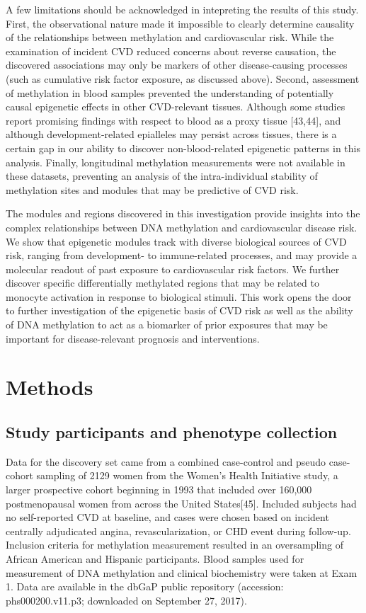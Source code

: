 \documentclass[]{article}
\theoremstyle{definition}
\theoremstyle{definition}
\theoremstyle{definition}
\theoremstyle{remark}
\begin{document}
A few limitations should be acknowledged in intepreting the results of
this study. First, the observational nature made it impossible to
clearly determine causality of the relationships between methylation and
cardiovascular risk. While the examination of incident CVD reduced
concerns about reverse causation, the discovered associations may only
be markers of other disease-causing processes (such as cumulative risk
factor exposure, as discussed above). Second, assessment of methylation
in blood samples prevented the understanding of potentially causal
epigenetic effects in other CVD-relevant tissues. Although some studies
report promising findings with respect to blood as a proxy tissue
{[}43,44{]}, and although development-related epialleles may persist
across tissues, there is a certain gap in our ability to discover
non-blood-related epigenetic patterns in this analysis. Finally,
longitudinal methylation measurements were not available in these
datasets, preventing an analysis of the intra-individual stability of
methylation sites and modules that may be predictive of CVD risk.

The modules and regions discovered in this investigation provide
insights into the complex relationships between DNA methylation and
cardiovascular disease risk. We show that epigenetic modules track with
diverse biological sources of CVD risk, ranging from development- to
immune-related processes, and may provide a molecular readout of past
exposure to cardiovascular risk factors. We further discover specific
differentially methylated regions that may be related to monocyte
activation in response to biological stimuli. This work opens the door
to further investigation of the epigenetic basis of CVD risk as well as
the ability of DNA methylation to act as a biomarker of prior exposures
that may be important for disease-relevant prognosis and interventions.

\newpage

\section{Methods}\label{methods}

\subsection{Study participants and phenotype
collection}\label{study-participants-and-phenotype-collection}

Data for the discovery set came from a combined case-control and pseudo
case-cohort sampling of 2129 women from the Women's Health Initiative
study, a larger prospective cohort beginning in 1993 that included over
160,000 postmenopausal women from across the United States{[}45{]}.
Included subjects had no self-reported CVD at baseline, and cases were
chosen based on incident centrally adjudicated angina,
revascularization, or CHD event during follow-up. Inclusion criteria for
methylation measurement resulted in an oversampling of African American
and Hispanic participants. Blood samples used for measurement of DNA
methylation and clinical biochemistry were taken at Exam 1. Data are
available in the dbGaP public repository (accession: phs000200.v11.p3;
downloaded on September 27, 2017).
\end{document}
